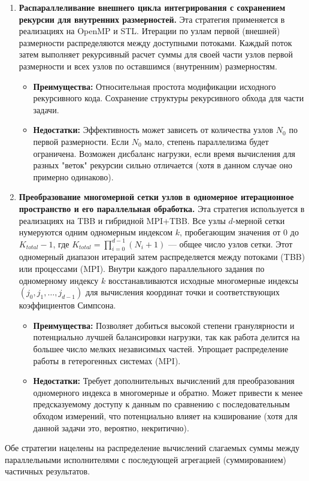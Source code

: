 \documentclass[a4paper,12pt]{article}
\begin{document}
\begin{enumerate}
    \item \textbf{Распараллеливание внешнего цикла интегрирования с сохранением рекурсии для внутренних размерностей.}
    Эта стратегия применяется в реализациях на OpenMP и STL. Итерации по узлам первой (внешней) размерности распределяются между доступными потоками. Каждый поток затем выполняет рекурсивный расчет суммы для своей части узлов первой размерности и всех узлов по оставшимся (внутренним) размерностям.
    \begin{itemize}
        \item \textbf{Преимущества:} Относительная простота модификации исходного рекурсивного кода. Сохранение структуры рекурсивного обхода для части задачи.
        \item \textbf{Недостатки:} Эффективность может зависеть от количества узлов $N_0$ по первой размерности. Если $N_0$ мало, степень параллелизма будет ограничена. Возможен дисбаланс нагрузки, если время вычисления для разных "веток" рекурсии сильно отличается (хотя в данном случае оно примерно одинаково).
    \end{itemize}

    \item \textbf{Преобразование многомерной сетки узлов в одномерное итерационное пространство и его параллельная обработка.}
    Эта стратегия используется в реализациях на TBB и гибридной MPI+TBB. Все узлы $d$-мерной сетки нумеруются одним одномерным индексом $k$, пробегающим значения от $0$ до $K_{total}-1$, где $K_{total} = \prod_{i=0}^{d-1} (N_i+1)$ — общее число узлов сетки. Этот одномерный диапазон итераций затем распределяется между потоками (TBB) или процессами (MPI). Внутри каждого параллельного задания по одномерному индексу $k$ восстанавливаются исходные многомерные индексы $(j_0, j_1, \dots, j_{d-1})$ для вычисления координат точки и соответствующих коэффициентов Симпсона.
    \begin{itemize}
        \item \textbf{Преимущества:} Позволяет добиться высокой степени гранулярности и потенциально лучшей балансировки нагрузки, так как работа делится на большее число мелких независимых частей. Упрощает распределение работы в гетерогенных системах (MPI).
        \item \textbf{Недостатки:} Требует дополнительных вычислений для преобразования одномерного индекса в многомерные и обратно. Может привести к менее предсказуемому доступу к данным по сравнению с последовательным обходом измерений, что потенциально влияет на кэширование (хотя для данной задачи это, вероятно, некритично).
    \end{itemize}
\end{enumerate}
Обе стратегии нацелены на распределение вычислений слагаемых суммы между параллельными исполнителями с последующей агрегацией (суммированием) частичных результатов.
\end{document}
